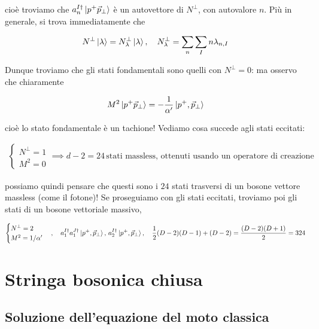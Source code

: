 \documentclass{report}
\begin{document}
cioè troviamo che \(a_n^{I\dagger}\ket{p^+ \vec{p}_\perp}\) è un autovettore di \(N^\perp\), con autovalore \(n\). Più in generale, si trova immediatamente che 

\begin{align}
    N^\perp \ket{\lambda} = N^\perp_\lambda \ket{\lambda}, \quad N^\perp_\lambda = \sum_n \sum_I n \lambda_{n, I}
\end{align}

Dunque troviamo che gli stati fondamentali sono quelli con \(N^\perp = 0\): ma osservo che chiaramente 

\begin{align}
    M^2 \ket{p^+ \vec{p}_\perp} = -\frac{1}{\alpha'}\ket{p^+, \vec{p}_\perp}
\end{align}

cioè lo stato fondamentale è un tachione! Vediamo cosa succede agli stati eccitati: 

\begin{align}
    \begin{cases}
        N^\perp = 1 \\ M^2 = 0 
    \end{cases} \implies d -2 = 24 \, \text{stati massless, ottenuti usando un operatore di creazione}
\end{align}

possiamo quindi pensare che questi sono i \(24\) stati trasversi di un bosone vettore massless (come il fotone)! Se proseguiamo con gli stati eccitati, troviamo poi gli stati di un bosone vettoriale massivo, 

\begin{align}
    \begin{cases}
        N^\perp = 2 \\
        M^2 = 1/\alpha'
    \end{cases}, \quad a_1^{I\dagger}a_1^{J\dagger}\ket{p^+, \vec{p}_\perp}, \, a_2^{I\dagger} \ket{p^+, \vec{p}_\perp}, \quad \frac{1}{2}(D-2)(D-1) + (D-2) =  \frac{(D-2)(D+1)}{2} = 324
\end{align}

\section{Stringa bosonica chiusa}

\subsection{Soluzione dell'equazione del moto classica}
\end{document}
